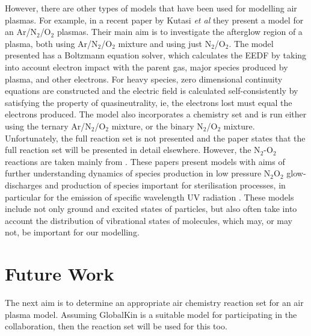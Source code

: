 \documentclass[11pt, oneside]{article}   	%
\begin{document}
%

However, there are other types of models that have been used for modelling air plasmas.
For example, in a recent paper by Kutasi \textit{et al} \cite{Kutasi2016tuning} they present a model for an Ar/N$_2$/O$_2$ plasmas.
Their main aim is to investigate the afterglow region of a plasma, both using Ar/N$_2$/O$_2$ mixture and using just N$_2$/O$_2$.
The model presented has a Boltzmann equation solver, which calculates the EEDF by taking into account electron impact with the parent gas, major species produced by plasma, and other electrons.
For heavy species, zero dimensional continuity equations are constructed and the electric field is calculated self-consistently by satisfying the property of quasineutrality, ie, the electrons lost must equal the electrons produced.
The model also incorporates a chemistry set and is run either using the ternary Ar/N$_2$/O$_2$ mixture, or the binary N$_2$/O$_2$ mixture.
Unfortunately, the full reaction set is not presented and the paper states that the full reaction set will be presented in detail elsewhere.
However, the N$_2$-O$_2$ reactions are taken mainly from \cite{Guerra1997self, Pintassilgo2005modelling, Kutasi2008modelling}.
These papers present models with aims of further understanding dynamics of species production in low pressure N$_2$O$_2$ glow-discharges \cite{Guerra1997self} and production of species important for sterilisation processes, in particular for the emission of specific wavelength UV radiation \cite{Pintassilgo2005modelling, Kutasi2008modelling}.
These models include not only ground and excited states of particles, but also often take into account the distribution of vibrational states of molecules, which may, or may not, be important for our modelling.


\section{Future Work}

The next aim is to determine an appropriate air chemistry reaction set for an air plasma model.
Assuming GlobalKin is a suitable model for participating in the collaboration, then the reaction set will be used for this too.
\end{document}
